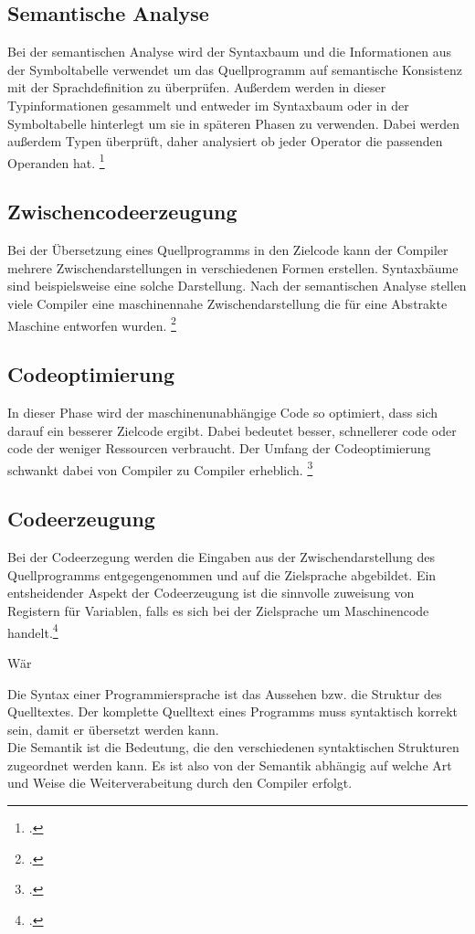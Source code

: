 \subsection{Semantische Analyse}
Bei der semantischen Analyse wird der Syntaxbaum und die Informationen aus der Symboltabelle verwendet um das Quellprogramm auf semantische Konsistenz mit der Sprachdefinition zu überprüfen. Außerdem werden in dieser Typinformationen gesammelt und entweder im Syntaxbaum oder in der Symboltabelle hinterlegt um sie in späteren Phasen zu verwenden. Dabei werden außerdem Typen überprüft, daher analysiert ob jeder Operator die passenden Operanden hat. \footcite[Vgl.][S. 9ff]{Ullmann2008}
\subsection{Zwischencodeerzeugung}
Bei der Übersetzung eines Quellprogramms in den Zielcode kann der Compiler mehrere Zwischendarstellungen in verschiedenen Formen erstellen. Syntaxbäume sind beispielsweise eine solche Darstellung. Nach der semantischen Analyse stellen viele Compiler eine maschinennahe Zwischendarstellung die für eine Abstrakte Maschine entworfen wurden.  \footcite[Vgl.][S. 11]{Ullmann2008}
\subsection{Codeoptimierung}
In dieser Phase wird der maschinenunabhängige Code so optimiert, dass sich darauf ein besserer Zielcode ergibt. Dabei bedeutet besser, schnellerer code oder code der weniger Ressourcen verbraucht. Der Umfang der Codeoptimierung schwankt dabei von Compiler zu Compiler erheblich.  \footcite[Vgl.][S. 11f]{Ullmann2008}
\subsection{Codeerzeugung}
Bei der Codeerzegung werden die Eingaben aus der Zwischendarstellung des Quellprogramms entgegengenommen und auf die Zielsprache abgebildet. Ein entsheidender Aspekt der Codeerzeugung ist die sinnvolle zuweisung von Registern für Variablen, falls es sich bei der Zielsprache um Maschinencode handelt.\footcite[Vgl.][S. 13]{Ullmann2008}



Wär

Die Syntax einer Programmiersprache ist das Aussehen bzw. die Struktur des Quelltextes. Der komplette Quelltext eines Programms muss syntaktisch korrekt sein, damit er übersetzt werden kann.  \\
Die Semantik ist die Bedeutung, die den verschiedenen syntaktischen Strukturen zugeordnet werden kann. Es ist also von der Semantik abhängig auf welche Art und Weise die Weiterverabeitung durch den Compiler erfolgt. 


